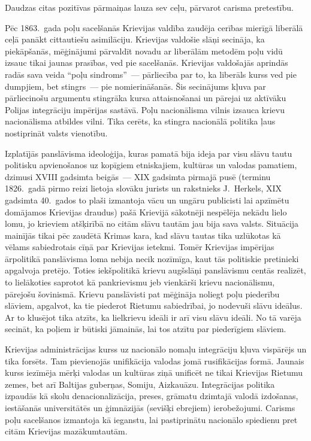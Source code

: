 \documentclass[twoside,a5paper,12pt,fleqn,openany]{extbook}
\begin{document}
Daudzas citas pozitīvas pārmaiņas lauza sev ceļu, pārvarot carisma pretestību.

Pēc 1863.~gada poļu sacelšanās Krievijas valdība zaudēja cerības mierīgā liberālā ceļā panākt cittautiešu asimilāciju. Krievijas valdošie slāņi secināja, ka piekāpšanās, mēģinājumi pārvaldīt novadu ar liberālām metodēm poļu vidū izsauc tikai jaunas prasības, ved pie sacelšanās. Krievijas valdošajās aprindās radās sava veida ``poļu sindroms''~--- pārliecība par to, ka liberāls kurss ved pie dumpjiem, bet stingrs~--- pie nomierināšanās. Šis secinājums kļuva par pārliecinošu argumentu stingrāka kursa attaisnošanai un pārejai uz aktīvāku Polijas integrāciju impērijas sastāvā. Poļu nacionālisma vilnis izsauca krievu nacionālisma atbildes vilni. Tika cerēts, ka stingra nacionālā politika ļaus nostiprināt valsts vienotību.

Izplatījās panslāvisma ideoloģija, kuras pamatā bija ideja par visu slāvu tautu politisku apvienošanos uz kopīgiem etniskajiem, kultūras un valodas pamatiem, dzimusi XVIII gadsimta beigās~--- XIX gadsimta pirmajā pusē (terminu 1826.~gadā pirmo reizi lietoja slovāku jurists un rakstnieks J.~Herkels, XIX gadsimta 40.~gados to plaši izmantoja vācu un ungāru publicisti lai apzīmētu domājamos Krievijas draudus) pašā Krievijā sākotnēji nespēlēja nekādu lielo lomu, jo krieviem atšķirībā no citām slāvu tautām jau bija sava valsts. Situācija mainījās tikai pēc zaudētā Krimas kara, kad slāvu tautas tika uzlūkotas kā vēlams sabiedrotais cīņā par Krievijas ietekmi. Tomēr Krievijas impērijas ārpolitikā panslāvisma loma nebija necik nozīmīga, kaut tās politiskie pretinieki apgalvoja pretējo. Toties iekšpolitikā krievu augšslāņi panslāvismu centās realizēt, to lielākoties saprotot kā pankrievismu jeb vienkārši krievu nacionālismu, pārejošu šovinismā. Krievu panslāvisti pat mēģināja noliegt poļu piederību slāviem, apgalvot, ka tie piederot Rietumu sabiedrībai, jo nodevuši slāvu ideālus. Ar to klusējot tika atzīts, ka lielkrievu ideāli ir arī visu slāvu ideāli. No tā varēja secināt, ka poļiem ir būtiski jāmainās, lai tos atzītu par piederīgiem slāviem.

Krievijas administrācijas kurss uz nacionālo nomaļu integrāciju kļuva vispārējs un tika forsēts. Tam pievienojās unifikācija valodas jomā rusifikācijas formā. Jaunais kurss iezīmēja mērķi valodas un kultūras ziņā unificēt ne tikai Krievijas Rietumu zemes, bet arī Baltijas guberņas, Somiju, Aizkauāzu. Integrācijas politika izpaudās kā skolu denacionalizācija, preses, grāmatu dzimtajā valodā izdošanas, iestāšanās universitātēs un ģimnāzijās (sevišķi ebrejiem) ierobežojumi. Carisms poļu sacelšanos izmantoja kā ieganstu, lai pastiprinātu nacionālo spiedienu pret citām Krievijas mazākumtautām.
\end{document}
